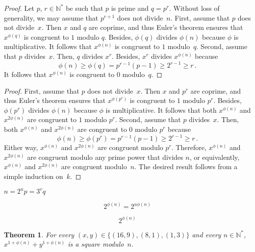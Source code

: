 \documentclass[12pt]{article}
\newcommand{\bN}{\mathbb{N}} %
\newcommand{\bNast}{\bN^*}
\newtheorem{theorem}{Theorem}
\theoremstyle{definition}
\begin{document}
  \begin{proof}
    Let $p$, $r \in \bNast$ be such that
    $p$ is prime and $q = p^r$.
    Without loss of generality, we may assume that $p^{r + 1}$ does not divide~$n$.
    First, assume that $p$ does not divide~$x$.
    Then $x$ and $q$ are coprime,
    and thus Euler's theorem ensures that $x^{\phi(q)}$ is congruent to $1$ modulo $q$.
    Besides, $\phi(q)$ divides $\phi(n)$ because $\phi$ is multiplicative.
    It follows that $x^{\phi(n)}$ is congruent to $1$ modulo~$q$.
    Second, assume that $p$ divides~$x$.
    Then, $q$ divides $x^r$.
    Besides, $x^r$ divides $x^{\phi(n)}$ because
    $$
    \phi(n) \ge \phi(q) = p^{r - 1} (p - 1) \ge 2^{r - 1} \ge r \,.
    $$
    It follows that $x^{\phi(n)}$ is congruent to $0$ modulo~$q$.
\end{proof} 
  
  \begin{proof}
    First, assume that $p$ does not divide~$x$.
    Then $x$ and $p^r$ are coprime,
    and thus Euler's theorem ensures that $x^{\phi(p^r)}$ is congruent to $1$ modulo $p^r$.
    Besides,  $\phi(p^r)$ divides $\phi(n)$ because $\phi$ is multiplicative.
    It follows that both $x^{\phi(n)}$ and $x^{2\phi(n)}$ are congruent to $1$ modulo $p^r$.
    Second, assume that $p$ divides~$x$.
    Then, both  $x^{\phi(n)}$ and $x^{2\phi(n)}$ are congruent to $0$ modulo $p^r$
    because
    $$
    \phi(n) \ge \phi(p^r) = p^{r - 1} (p - 1) \ge 2^{r - 1} \ge r \, .
    $$  
    Either way, $x^{\phi(n)}$ and $x^{2\phi(n)}$ are congruent modulo $p^r$.
    Therefore, $x^{\phi(n)}$ and $x^{2\phi(n)}$ are congruent modulo any prime power that divides $n$,
    or equivalently, $x^{\phi(n)}$ and $x^{2\phi(n)}$ are congruent modulo~$n$.
    The desired result follows from a simple induction on~$k$.
  \end{proof}
  
  $n = 2^u p = 3^v q$
  
  $$
  2^{\phi(n)} = 2^{u \phi(n)} 
  $$

  $$
  2^{\phi(n)}
  $$
  \begin{theorem}
    For every $(x, y) \in \{ (16, 9), (8, 1), (1, 3) \}$ and every $n \in \bNast$, 
    $x^{1 + \phi(n)} + y^{1 + \phi(n)}$ is a square modulo~$n$. 
  \end{theorem}
\end{document}
